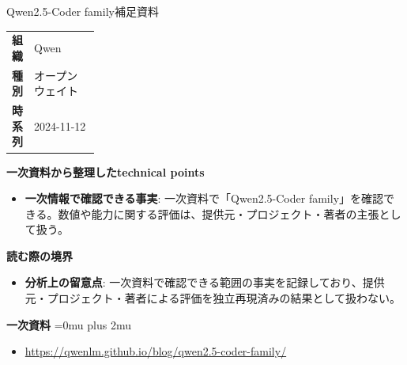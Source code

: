 \begin{technicalnote}{Qwen2.5-Coder family}{補足資料}
\begingroup
\begin{tabularx}{\linewidth}{@{}>{\bfseries}p{0.22\linewidth}X@{}}
組織 & Qwen \\
種別 & オープンウェイト \\
時系列 & 2024-11-12 \\
\end{tabularx}
\smallskip
{\bfseries 一次資料から整理したtechnical points}
\begin{itemize}[leftmargin=1.5em,itemsep=0.35em]
\item \textbf{一次情報で確認できる事実}: 一次資料で「Qwen2.5-Coder family」を確認できる。数値や能力に関する評価は、提供元・プロジェクト・著者の主張として扱う。
\end{itemize}
\begin{minipage}{\linewidth}
{\bfseries 読む際の境界}
\begin{itemize}[leftmargin=1.5em,itemsep=0.35em]
\item \textbf{分析上の留意点}: 一次資料で確認できる範囲の事実を記録しており、提供元・プロジェクト・著者による評価を独立再現済みの結果として扱わない。
\end{itemize}
\begin{samepage}
{\bfseries 一次資料}
\begingroup\sloppy
\Urlmuskip=0mu plus 2mu\relax
\begin{itemize}[leftmargin=1.5em,itemsep=0.25em]
\item {\scriptsize\url{https://qwenlm.github.io/blog/qwen2.5-coder-family/}}
\end{itemize}
\endgroup
\end{samepage}
\end{minipage}
\endgroup
\end{technicalnote}
\medskip

